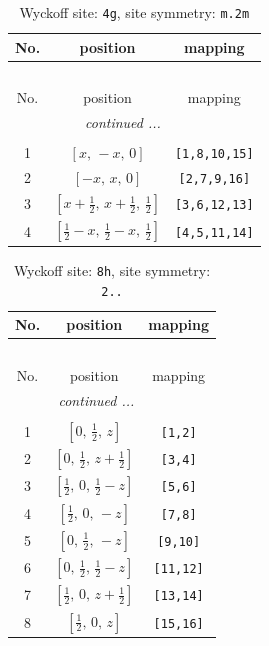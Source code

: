 \documentclass[fleqn,8pt]{jsarticle}
\begin{document}
\renewcommand{\arraystretch}{1.2}
\begin{longtable}{ccc}
\caption{Wyckoff site: {\tt 4g}, site symmetry: {\tt m.2m}}
 \\
 \hline \hline
No. & position & mapping \\ \hline \endfirsthead

\multicolumn{2}{l}{\tablename\ \thetable{}} \\
 \hline \hline
No. & position & mapping \\ \hline \endhead

 \hline \hline
\multicolumn{2}{r}{\footnotesize\it continued ...} \\ \endfoot

 \hline \hline
\multicolumn{2}{r}{} \\ \endlastfoot

1 & $\left[ x,\, - x,\, 0 \right]$ & {\tt [1,8,10,15]} \\ \hline
2 & $\left[ - x,\, x,\, 0 \right]$ & {\tt [2,7,9,16]} \\ \hline
3 & $\left[ x + \frac{1}{2},\, x + \frac{1}{2},\, \frac{1}{2} \right]$ & {\tt [3,6,12,13]} \\ \hline
4 & $\left[ \frac{1}{2} - x,\, \frac{1}{2} - x,\, \frac{1}{2} \right]$ & {\tt [4,5,11,14]} \\
\end{longtable}
\renewcommand{\arraystretch}{1.2}
\begin{longtable}{ccc}
\caption{Wyckoff site: {\tt 8h}, site symmetry: {\tt 2..}}
 \\
 \hline \hline
No. & position & mapping \\ \hline \endfirsthead

\multicolumn{2}{l}{\tablename\ \thetable{}} \\
 \hline \hline
No. & position & mapping \\ \hline \endhead

 \hline \hline
\multicolumn{2}{r}{\footnotesize\it continued ...} \\ \endfoot

 \hline \hline
\multicolumn{2}{r}{} \\ \endlastfoot

1 & $\left[ 0,\, \frac{1}{2},\, z \right]$ & {\tt [1,2]} \\ \hline
2 & $\left[ 0,\, \frac{1}{2},\, z + \frac{1}{2} \right]$ & {\tt [3,4]} \\ \hline
3 & $\left[ \frac{1}{2},\, 0,\, \frac{1}{2} - z \right]$ & {\tt [5,6]} \\ \hline
4 & $\left[ \frac{1}{2},\, 0,\, - z \right]$ & {\tt [7,8]} \\ \hline
5 & $\left[ 0,\, \frac{1}{2},\, - z \right]$ & {\tt [9,10]} \\ \hline
6 & $\left[ 0,\, \frac{1}{2},\, \frac{1}{2} - z \right]$ & {\tt [11,12]} \\ \hline
7 & $\left[ \frac{1}{2},\, 0,\, z + \frac{1}{2} \right]$ & {\tt [13,14]} \\ \hline
8 & $\left[ \frac{1}{2},\, 0,\, z \right]$ & {\tt [15,16]} \\
\end{longtable}
\end{document}
